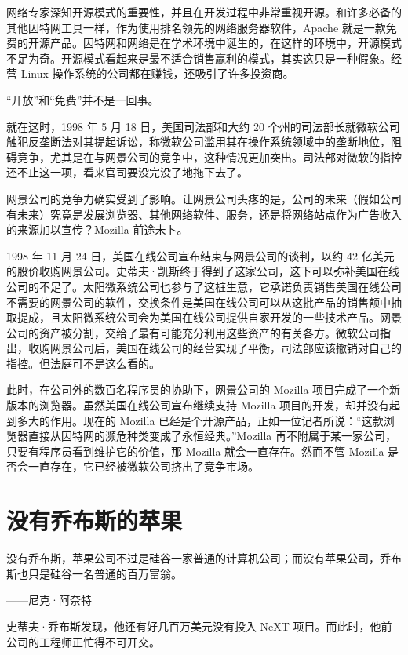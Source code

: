 \documentclass[12pt,UTF8]{ctexbook}
\begin{document}
网络专家深知开源模式的重要性，并且在开发过程中非常重视开源。和许多必备的其他因特网工具一样，作为使用排名领先的网络服务器软件，Apache 就是一款免费的开源产品。因特网和网络是在学术环境中诞生的，在这样的环境中，开源模式不足为奇。开源模式看起来是最不适合销售赢利的模式，其实这只是一种假象。经营 Linux 操作系统的公司都在赚钱，还吸引了许多投资商。

“开放”和“免费”并不是一回事。

就在这时，1998 年 5 月 18 日，美国司法部和大约 20 个州的司法部长就微软公司触犯反垄断法对其提起诉讼，称微软公司滥用其在操作系统领域中的垄断地位，阻碍竞争，尤其是在与网景公司的竞争中，这种情况更加突出。司法部对微软的指控还不止这一项，看来官司要没完没了地拖下去了。

网景公司的竞争力确实受到了影响。让网景公司头疼的是，公司的未来（假如公司有未来）究竟是发展浏览器、其他网络软件、服务，还是将网络站点作为广告收入的来源加以宣传？Mozilla 前途未卜。

1998 年 11 月 24 日，美国在线公司宣布结束与网景公司的谈判，以约 42 亿美元的股价收购网景公司。史蒂夫·凯斯终于得到了这家公司，这下可以弥补美国在线公司的不足了。太阳微系统公司也参与了这桩生意，它承诺负责销售美国在线公司不需要的网景公司的软件，交换条件是美国在线公司可以从这批产品的销售额中抽取提成，且太阳微系统公司会为美国在线公司提供自家开发的一些技术产品。网景公司的资产被分割，交给了最有可能充分利用这些资产的有关各方。微软公司指出，收购网景公司后，美国在线公司的经营实现了平衡，司法部应该撤销对自己的指控。但法庭可不是这么看的。

此时，在公司外的数百名程序员的协助下，网景公司的 Mozilla 项目完成了一个新版本的浏览器。虽然美国在线公司宣布继续支持 Mozilla 项目的开发，却并没有起到多大的作用。现在的 Mozilla 已经是个开源产品，正如一位记者所说：“这款浏览器直接从因特网的濒危种类变成了永恒经典。”Mozilla 再不附属于某一家公司，只要有程序员看到维护它的价值，那 Mozilla 就会一直存在。然而不管 Mozilla 是否会一直存在，它已经被微软公司挤出了竞争市场。





\section{没有乔布斯的苹果}


没有乔布斯，苹果公司不过是硅谷一家普通的计算机公司；而没有苹果公司，乔布斯也只是硅谷一名普通的百万富翁。

——尼克·阿奈特



史蒂夫·乔布斯发现，他还有好几百万美元没有投入 NeXT 项目。而此时，他前公司的工程师正忙得不可开交。
\end{document}
